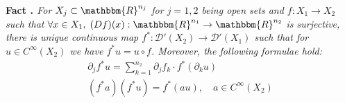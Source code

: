 \documentclass{article}
\newcommand{\tmtextbf}[1]{{\bfseries{#1}}}
\newcommand{\tmtextit}[1]{{\itshape{#1}}}
\newcommand{\tmtextup}[1]{{\upshape{#1}}}
\numberwithin{definition}{section}
\numberwithin{lemma}{section}
\numberwithin{proposition}{section}
{\theorembodyfont{\rmfamily}\newtheorem{remark}{Remark}
\numberwithin{remark}{section}
}
\begin{document}
{\noindent}\tmtextbf{Fact \tmtextup{14}.
}\tmtextit{\label{lem67:fact-pullback}{\cite[thm.
6.1.2]{hormander1983analysis}} For $X_j \subset \mathbbm{R}^{n_j}$ for $j = 1,
2$ being open sets and $f : X_1 \rightarrow X_2$ such that $\forall x \in X_1,
\; ( D f) ( x) : \mathbbm{R}^{n_1} \rightarrow \mathbbm{R}^{n_2}$ is
surjective, there is unique continuous map $f^{\ast} : \mathcal{D}' ( X_2)
\rightarrow \mathcal{D}' ( X_1)$ such that for $u \in C^{\infty} ( X_2)$ we
have $f^{\ast} u = u \circ f$. Moreover, the following formulae hold:
\begin{eqnarray}
  & \partial_j f^{\ast} u = \sum_{k = 1}^{n_2} \partial_j f_k \cdot f^{\ast}
  ( \partial_k u) &  \nonumber\\
  & ( f^{\ast} a) ( f^{\ast} u) = f^{\ast} ( a u), \hspace{1em} a \in
  C^{\infty} ( X_2) &  \nonumber
\end{eqnarray}}{\hspace*{\fill}}{\medskip}
\end{document}

